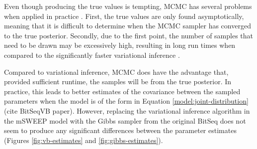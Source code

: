 \documentclass[officiallayout]{tktla}
\begin{document}
Even though producing the true values is tempting, MCMC has several
problems when applied in practice \citep{blei2017variational}. First,
the true values are only found asymptotically, meaning that it is
difficult to determine when the MCMC sampler has converged to the true
posterior. Secondly, due to the first point, the number of samples
that need to be drawn may be excessively high, resulting in long run
times when compared to the significantly faster variational inference
\citep{blei2017variational}.

Compared to variational inference, MCMC does have the advantage that,
provided sufficient runtime, the samples will be from the true
posterior. In practice, this leads to better estimates of the
covariance between the sampled parameters when the model is of the
form in Equation \eqref{model:joint-distribution} (cite BitSeqVB
paper). However, replacing the variational inference algorithm in the
mSWEEP model with the Gibbs sampler from the original BitSeq
\citep{glaus2012identifying} does not seem to produce any significant
differences between the parameter estimates (Figures
\ref{fig:vb-estimates} and \ref{fig:gibbs-estimates}).
\end{document}
